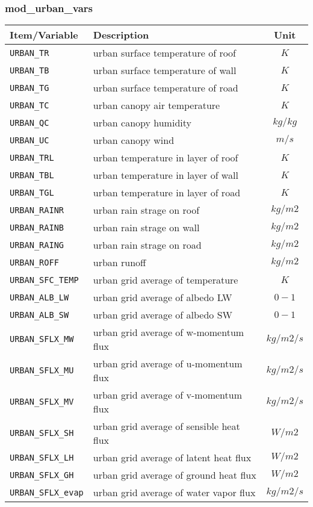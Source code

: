 \subsubsection{mod\_urban\_vars}
 \begin{tabularx}{150mm}{|l|X|c|} \hline
 \rowcolor[gray]{0.9} Item/Variable & Description  & Unit \\\hline
  \verb|URBAN_TR|    & urban surface temperature of roof  & $K$ \\\hline
  \verb|URBAN_TB|    & urban surface temperature of wall  & $K$ \\\hline
  \verb|URBAN_TG|    & urban surface temperature of road  & $K$ \\\hline
  \verb|URBAN_TC|    & urban canopy air temperature       & $K$ \\\hline
  \verb|URBAN_QC|    & urban canopy humidity              & $kg/kg$ \\\hline
  \verb|URBAN_UC|    & urban canopy wind                  & $m/s$ \\\hline
  \verb|URBAN_TRL|   & urban temperature in layer of roof & $K$ \\\hline
  \verb|URBAN_TBL|   & urban temperature in layer of wall & $K$ \\\hline
  \verb|URBAN_TGL|   & urban temperature in layer of road & $K$ \\\hline
  \verb|URBAN_RAINR| & urban rain strage on roof          & $kg/m2$ \\\hline
  \verb|URBAN_RAINB| & urban rain strage on wall          & $kg/m2$ \\\hline
  \verb|URBAN_RAING| & urban rain strage on road          & $kg/m2$ \\\hline
  \verb|URBAN_ROFF|  & urban runoff                       & $kg/m2$ \\\hline
  \verb|URBAN_SFC_TEMP| & urban grid average of temperature  & $K$ \\\hline
  \verb|URBAN_ALB_LW|   & urban grid average of albedo LW    & $0-1$ \\\hline
  \verb|URBAN_ALB_SW|   & urban grid average of albedo SW    & $0-1$ \\\hline
  \verb|URBAN_SFLX_MW|  & urban grid average of w-momentum flux    & $kg/m2/s$ \\\hline
  \verb|URBAN_SFLX_MU|  & urban grid average of u-momentum flux    & $kg/m2/s$ \\\hline
  \verb|URBAN_SFLX_MV|  & urban grid average of v-momentum flux    & $kg/m2/s$ \\\hline
  \verb|URBAN_SFLX_SH|  & urban grid average of sensible heat flux & $W/m2$ \\\hline
  \verb|URBAN_SFLX_LH|  & urban grid average of latent heat flux   & $W/m2$ \\\hline
  \verb|URBAN_SFLX_GH|  & urban grid average of ground heat flux   & $W/m2$ \\\hline
  \verb|URBAN_SFLX_evap| & urban grid average of water vapor flux  & $kg/m2/s$ \\\hline
 \end{tabularx}

